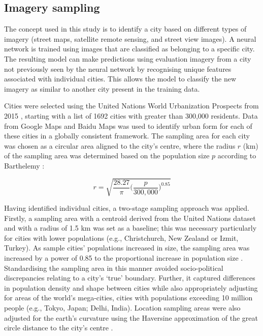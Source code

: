 \documentclass[10pt,letterpaper,hidelinks]{article}
\begin{document}
\subsection*{Imagery sampling}\label{sec:methods2}

The concept used in this study is to identify a city based on different types of imagery (street maps, satellite remote sensing, and street view images). A neural network is trained using images that are classified as belonging to a specific city. The resulting model can make predictions using evaluation imagery from a city not previously seen by the neural network by recognising unique features associated with individual cities. This allows the model to classify the new imagery as similar to another city present in the training data. 

Cities were selected using the United Nations World Urbanization Prospects from 2015 \cite{UN2014}, starting with a list of 1692 cities with greater than 300,000 residents. Data from Google Maps and Baidu Maps was used to identify urban form for each of these cities in a globally consistent framework. The sampling area for each city was chosen as a circular area aligned to the city's centre, where the radius $r$ (km) of the sampling area was determined based on the population size $p$ according to Barthelemy \cite{Barthelemy2016}: 

\begin{equation}
r = \sqrt{ \frac{28.27}{\pi} \bigg( \frac{p}{300,000}  \bigg)^{0.85} }
\end{equation}

Having identified individual cities, a two-stage sampling approach was applied. Firstly, a sampling area with a centroid derived from the United Nations dataset and with a radius of 1.5 km was set as a baseline; this was necessary particularly for cities with lower populations (e.g., Christchurch, New Zealand or Izmit, Turkey). As sample cities' populations increased in size, the sampling area was increased by a power of 0.85 to the proportional increase in population size \cite{Barthelemy2016}. Standardising the sampling area in this manner avoided socio-political discrepancies relating to a city's `true' boundary. Further, it captured differences in population density and shape between cities while also appropriately adjusting for areas of the world's mega-cities, cities with populations exceeding 10 million people (e.g., Tokyo, Japan;  Delhi, India). Location sampling areas were also adjusted for the earth's curvature using the Haversine approximation of the great circle distance to the city's centre \cite{Sinnott1984}. 
\end{document}
